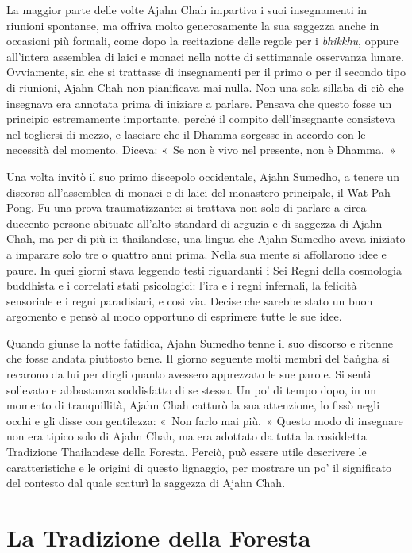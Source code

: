 La maggior parte delle volte Ajahn Chah impartiva i suoi insegnamenti in
riunioni spontanee, ma offriva molto generosamente la sua saggezza anche
in occasioni più formali, come dopo la recitazione delle regole per i
\emph{bhikkhu}, oppure all'intera assemblea di laici e monaci nella
notte di settimanale osservanza lunare. Ovviamente, sia che si trattasse
di insegnamenti per il primo o per il secondo tipo di riunioni, Ajahn
Chah non pianificava mai nulla. Non una sola sillaba di ciò che
insegnava era annotata prima di iniziare a parlare. Pensava che questo
fosse un principio estremamente importante, perché il compito
dell'insegnante consisteva nel togliersi di mezzo, e lasciare che il
Dhamma sorgesse in accordo con le necessità del momento. Diceva: «~Se
non è vivo nel presente, non è Dhamma.~»

Una volta invitò il suo primo discepolo occidentale, Ajahn Sumedho, a
tenere un discorso all'assemblea di monaci e di laici del monastero
principale, il Wat Pah Pong. Fu una prova traumatizzante: si trattava
non solo di parlare a circa duecento persone abituate all'alto standard
di arguzia e di saggezza di Ajahn Chah, ma per di più in thailandese,
una lingua che Ajahn Sumedho aveva iniziato a imparare solo tre o
quattro anni prima. Nella sua mente si affollarono idee e paure. In quei
giorni stava leggendo testi riguardanti i Sei Regni della cosmologia
buddhista e i correlati stati psicologici: l'ira e i regni infernali, la
felicità sensoriale e i regni paradisiaci, e così via. Decise che
sarebbe stato un buon argomento e pensò al modo opportuno di esprimere
tutte le sue idee.

Quando giunse la notte fatidica, Ajahn Sumedho tenne il suo discorso e
ritenne che fosse andata piuttosto bene. Il giorno seguente molti membri
del Saṅgha si recarono da lui per dirgli quanto avessero apprezzato le
sue parole. Si sentì sollevato e abbastanza soddisfatto di se stesso. Un
po' di tempo dopo, in un momento di tranquillità, Ajahn Chah catturò la
sua attenzione, lo fissò negli occhi e gli disse con gentilezza: «~Non
farlo mai più.~» Questo modo di insegnare non era tipico solo di Ajahn
Chah, ma era adottato da tutta la cosiddetta Tradizione Thailandese
della Foresta. Perciò, può essere utile descrivere le caratteristiche e
le origini di questo lignaggio, per mostrare un po' il significato del
contesto dal quale scaturì la saggezza di Ajahn Chah.

\section{La Tradizione della Foresta}

